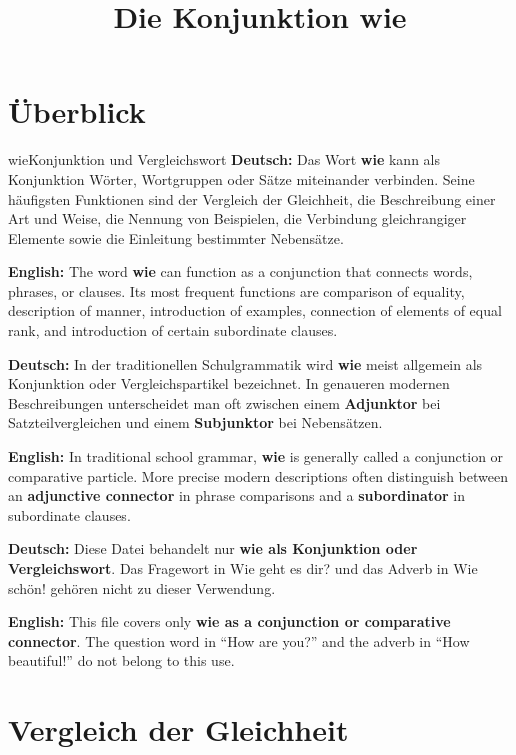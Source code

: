 \documentclass[a4paper,11pt]{article}
\title{Die Konjunktion \glqq wie\grqq}
\author{}
\date{}
\newcommand{\GermanText}[1]{\textbf{Deutsch: }#1\par}
\newcommand{\EnglishText}[1]{{\small\color{SoftGray}\textbf{English: }#1\par}}
\begin{document}
\maketitle
\tableofcontents
\newpage

\section{Überblick}

\begin{grammarentry}{wie}{Konjunktion und Vergleichswort}
\GermanText{Das Wort \textbf{wie} kann als Konjunktion Wörter, Wortgruppen oder Sätze miteinander verbinden. Seine häufigsten Funktionen sind der Vergleich der Gleichheit, die Beschreibung einer Art und Weise, die Nennung von Beispielen, die Verbindung gleichrangiger Elemente sowie die Einleitung bestimmter Nebensätze.}
\EnglishText{The word \textbf{wie} can function as a conjunction that connects words, phrases, or clauses. Its most frequent functions are comparison of equality, description of manner, introduction of examples, connection of elements of equal rank, and introduction of certain subordinate clauses.}

\GermanText{In der traditionellen Schulgrammatik wird \textbf{wie} meist allgemein als Konjunktion oder Vergleichspartikel bezeichnet. In genaueren modernen Beschreibungen unterscheidet man oft zwischen einem \textbf{Adjunktor} bei Satzteilvergleichen und einem \textbf{Subjunktor} bei Nebensätzen.}
\EnglishText{In traditional school grammar, \textbf{wie} is generally called a conjunction or comparative particle. More precise modern descriptions often distinguish between an \textbf{adjunctive connector} in phrase comparisons and a \textbf{subordinator} in subordinate clauses.}
\end{grammarentry}

\begin{warningbox}
\GermanText{Diese Datei behandelt nur \textbf{wie als Konjunktion oder Vergleichswort}. Das Fragewort in \glqq Wie geht es dir?\grqq{} und das Adverb in \glqq Wie schön!\grqq{} gehören nicht zu dieser Verwendung.}
\EnglishText{This file covers only \textbf{wie as a conjunction or comparative connector}. The question word in ``How are you?'' and the adverb in ``How beautiful!'' do not belong to this use.}
\end{warningbox}

\section{Vergleich der Gleichheit}
\end{document}
